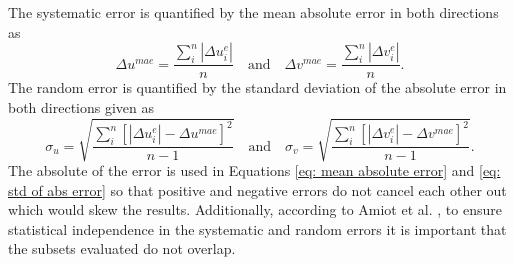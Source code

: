 \documentclass[12pt,oneside,openany,a4paper, %
english, %
masters-t, goldenblock]{usthesis}
\begin{document}
The systematic error is quantified by the mean absolute error in both directions as
\begin{equation}
  \label{eq: mean absolute error}
   \Delta u^{mae} = \frac{\sum_i^n \left| \Delta u_i^e \right| }{n} \quad \text{and} \quad \Delta v^{mae} = \frac{\sum_i^n \left| \Delta v_i^e \right| }{n}.
\end{equation}
The random error is quantified by the standard deviation of the absolute error in both directions given as 
\begin{equation}
  \label{eq: std of abs error}
  \sigma_u = \sqrt{\frac{\sum_i^n \left[ \left| \Delta u_i^e \right| -  \Delta u^{mae} \right]^2}{n-1}} \quad \text{and} \quad \sigma_v = \sqrt{\frac{\sum_i^n \left[ \left| \Delta v_i^e \right| -  \Delta v^{mae} \right]^2}{n-1}}.
\end{equation}
The absolute of the error is used in Equations \ref{eq: mean absolute error} and \ref{eq: std of abs error} so that positive and negative errors do not cancel each other out which would skew the results. Additionally, according to Amiot et al. \cite{amiot2013assessment},  to ensure statistical independence in the systematic and random errors it is important that the subsets evaluated do not overlap.













\end{document}
